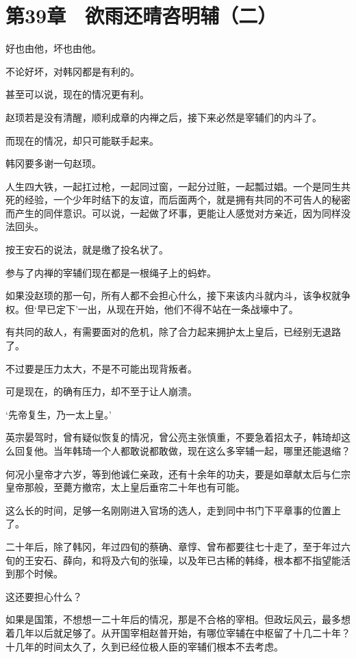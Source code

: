 \section{第39章　欲雨还晴咨明辅（二）}

好也由他，坏也由他。

不论好坏，对韩冈都是有利的。

甚至可以说，现在的情况更有利。

赵顼若是没有清醒，顺利成章的内禅之后，接下来必然是宰辅们的内斗了。

而现在的情况，却只可能联手起来。

韩冈要多谢一句赵顼。

人生四大铁，一起扛过枪，一起同过窗，一起分过赃，一起瓢过娼。一个是同生共死的经验，一个少年时结下的友谊，而后面两个，就是拥有共同的不可告人的秘密而产生的同伴意识。可以说，一起做了坏事，更能让人感觉对方亲近，因为同样没法回头。

按王安石的说法，就是缴了投名状了。

参与了内禅的宰辅们现在都是一根绳子上的蚂蚱。

如果没赵顼的那一句，所有人都不会担心什么，接下来该内斗就内斗，该争权就争权。但‘早已定下’一出，从现在开始，他们不得不站在一条战壕中了。

有共同的敌人，有需要面对的危机，除了合力起来拥护太上皇后，已经别无退路了。

不过要是压力太大，不是不可能出现背叛者。

可是现在，的确有压力，却不至于让人崩溃。

‘先帝复生，乃一太上皇。’

英宗晏驾时，曾有疑似恢复的情况，曾公亮主张慎重，不要急着招太子，韩琦却这么回复他。当年韩琦一个人都敢说都敢做，现在这么多宰辅一起，哪里还能退缩？

何况小皇帝才六岁，等到他诚仁亲政，还有十余年的功夫，要是如章献太后与仁宗皇帝那般，至薨方撤帘，太上皇后垂帘二十年也有可能。

这么长的时间，足够一名刚刚进入官场的选人，走到同中书门下平章事的位置上了。

二十年后，除了韩冈，年过四旬的蔡确、章惇、曾布都要往七十走了，至于年过六旬的王安石、薛向，和将及六旬的张璪，以及年已古稀的韩绛，根本都不指望能活到那个时候。

这还要担心什么？

如果是国策，不想想一二十年后的情况，那是不合格的宰相。但政坛风云，最多想着几年以后就足够了。从开国宰相赵普开始，有哪位宰辅在中枢留了十几二十年？十几年的时间太久了，久到已经位极人臣的宰辅们根本不去考虑。

